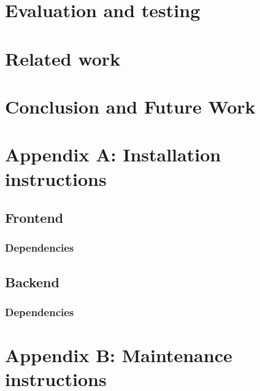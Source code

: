 \documentclass[11pt]{report}
\begin{document}











\chapter{Evaluation and testing}
\chapter{Related work}

\chapter{Conclusion and Future Work}
\chapter{Appendix A: Installation instructions}
\section {Frontend}
\subsection {Dependencies}
\section {Backend}
\subsection {Dependencies}
\chapter {Appendix B: Maintenance instructions}
\end{document}

